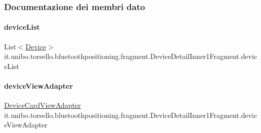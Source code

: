 \subsubsection{Documentazione dei membri dato}
\hypertarget{classit_1_1unibo_1_1torsello_1_1bluetoothpositioning_1_1fragment_1_1DeviceDetailInner1Fragment_a9e1211f228949b78f453eb9a65d93752_a9e1211f228949b78f453eb9a65d93752}{}\label{classit_1_1unibo_1_1torsello_1_1bluetoothpositioning_1_1fragment_1_1DeviceDetailInner1Fragment_a9e1211f228949b78f453eb9a65d93752_a9e1211f228949b78f453eb9a65d93752} 
\paragraph{\texorpdfstring{device\+List}{deviceList}}
{\footnotesize\ttfamily List$<$\hyperlink{classit_1_1unibo_1_1torsello_1_1bluetoothpositioning_1_1model_1_1Device}{Device}$>$ it.\+unibo.\+torsello.\+bluetoothpositioning.\+fragment.\+Device\+Detail\+Inner1\+Fragment.\+device\+List\hspace{0.3cm}{\ttfamily [private]}}

\hypertarget{classit_1_1unibo_1_1torsello_1_1bluetoothpositioning_1_1fragment_1_1DeviceDetailInner1Fragment_ac96cc01fc4f531a4cb38a31cf56e81e9_ac96cc01fc4f531a4cb38a31cf56e81e9}{}\label{classit_1_1unibo_1_1torsello_1_1bluetoothpositioning_1_1fragment_1_1DeviceDetailInner1Fragment_ac96cc01fc4f531a4cb38a31cf56e81e9_ac96cc01fc4f531a4cb38a31cf56e81e9} 
\paragraph{\texorpdfstring{device\+View\+Adapter}{deviceViewAdapter}}
{\footnotesize\ttfamily \hyperlink{classit_1_1unibo_1_1torsello_1_1bluetoothpositioning_1_1adapter_1_1DeviceCardViewAdapter}{Device\+Card\+View\+Adapter} it.\+unibo.\+torsello.\+bluetoothpositioning.\+fragment.\+Device\+Detail\+Inner1\+Fragment.\+device\+View\+Adapter\hspace{0.3cm}{\ttfamily [private]}}

